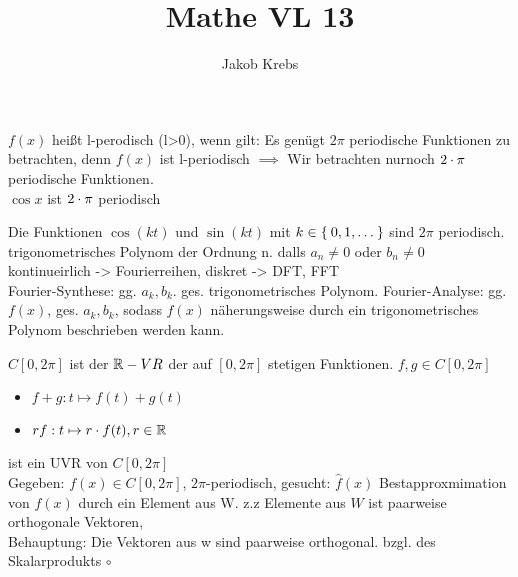\documentclass{../tudscript}
\author{Jakob Krebs}
\title{Mathe VL 13}
\begin{document}

        $f(x)$ heißt l-perodisch (l>0), wenn gilt:
            Es genügt $2 \pi$ periodische Funktionen zu betrachten, denn
            $f(x)$ ist l-periodisch $\implies$
            Wir betrachten nurnoch $2\cdot \pi$ periodische Funktionen.
            \\
            $\cos x$ ist $2\cdot \pi$ periodisch
            

            Die Funktionen $\cos (kt)$ und $\sin (kt)$ mit $k \in \Set{0, 1, \ldots}$ sind $2 \pi$ periodisch.
            trigonometrisches Polynom der Ordnung n. dalls $a_n\neq 0$ oder $b_n \neq 0$
        kontinueirlich -> Fourierreihen, diskret -> DFT, FFT
        \\
        Fourier-Synthese: gg. $a_k, b_k$. ges. trigonometrisches Polynom.
        Fourier-Analyse:  gg. $f(x)$, ges. $a_k, b_k$, sodass $f(x)$ näherungsweise 
        durch ein trigonometrisches Polynom beschrieben werden kann.
        
            $C[0, 2 \pi]$ ist der $\mathbb{R}-VR$ der auf $[0, 2 \pi]$ stetigen Funktionen.
            $f, g \in C[0, 2\pi]$
            \begin{itemize}
                \item $f+g: t \mapsto f(t) + g(t)$
                \item $rf: t \mapsto r \cdot f(t), r \in \mathbb{R}$
            \end{itemize}
            ist ein UVR von $C[0, 2\pi]$
        \\
        Gegeben: $f(x) \in C[0, 2 \pi]$, $2 \pi$-periodisch, gesucht: $\hat{f}(x)$ Bestapproxmimation von $f(x)$ durch ein Element aus W.
        z.z Elemente aus $W$ ist paarweise orthogonale Vektoren,
        \\
        Behauptung: Die Vektoren aus w sind paarweise orthogonal.
        bzgl. des Skalarprodukts $\circ$
\end{document}
